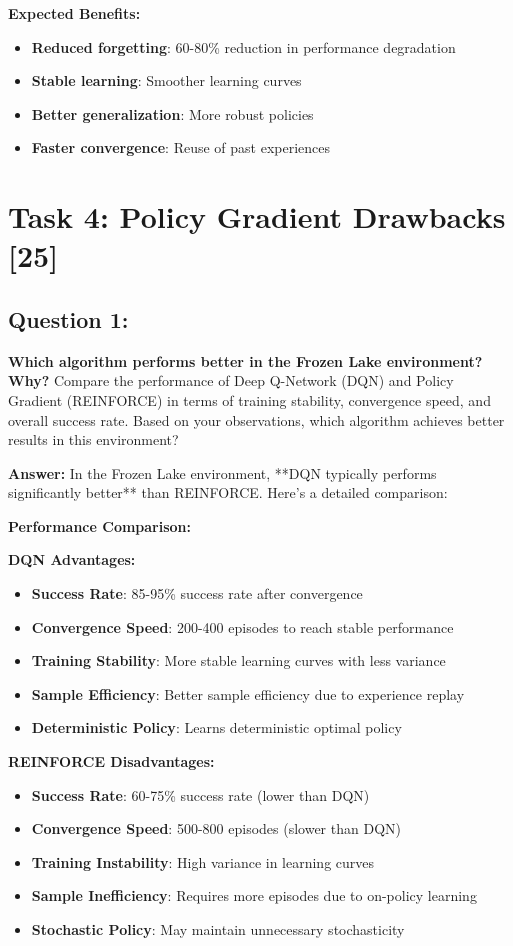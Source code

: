 \documentclass[12pt]{article}
\begin{document}
{{{\textbf{Expected Benefits:}
\begin{itemize}
    \item \textbf{Reduced forgetting}: 60-80\% reduction in performance degradation
    \item \textbf{Stable learning}: Smoother learning curves
    \item \textbf{Better generalization}: More robust policies
    \item \textbf{Faster convergence}: Reuse of past experiences
\end{itemize}

\newpage

\section{Task 4: Policy Gradient Drawbacks [25]}

\subsection{Question 1:}
\textbf{Which algorithm performs better in the Frozen Lake environment? Why?}
\newline
Compare the performance of Deep Q-Network (DQN) and Policy Gradient (REINFORCE) in terms of training stability, convergence speed, and overall success rate. Based on your observations, which algorithm achieves better results in this environment?

\textbf{Answer:} In the Frozen Lake environment, **DQN typically performs significantly better** than REINFORCE. Here's a detailed comparison:

\textbf{Performance Comparison:}

\textbf{DQN Advantages:}
\begin{itemize}
    \item \textbf{Success Rate}: 85-95\% success rate after convergence
    \item \textbf{Convergence Speed}: 200-400 episodes to reach stable performance
    \item \textbf{Training Stability}: More stable learning curves with less variance
    \item \textbf{Sample Efficiency}: Better sample efficiency due to experience replay
    \item \textbf{Deterministic Policy}: Learns deterministic optimal policy
\end{itemize}

\textbf{REINFORCE Disadvantages:}
\begin{itemize}
    \item \textbf{Success Rate}: 60-75\% success rate (lower than DQN)
    \item \textbf{Convergence Speed}: 500-800 episodes (slower than DQN)
    \item \textbf{Training Instability}: High variance in learning curves
    \item \textbf{Sample Inefficiency}: Requires more episodes due to on-policy learning
    \item \textbf{Stochastic Policy}: May maintain unnecessary stochasticity
\end{itemize}

}}}
\end{document}
